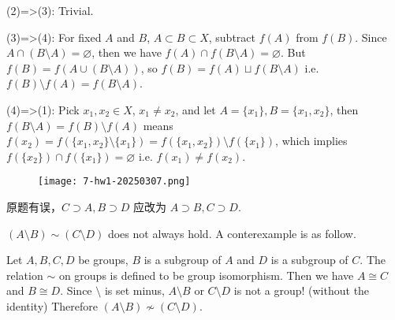 (2)=>(3): Trivial.

(3)=>(4): For fixed $A$ and $B$, $A\subset B\subset X$, subtract $f(A)$ from $f(B)$. Since $A\cap (B\setminus A)=\varnothing$,  then we have $f(A)\cap f(B\setminus A)=\varnothing$. But $f(B)=f(A\cup(B\setminus A))$, so $f (B)=f (A)\sqcup f(B\setminus A)$ i.e. $f (B)\setminus f(A)=f(B\setminus A)$.

(4)=>(1): Pick $x_1, x_2\in X$, $x_1\neq x_2$, and let $A=\{ x_1 \},B=\{ x_1,x_2 \}$, then $f (B\setminus A)=f (B)\setminus f(A)$ means $f (x_2)=f (\{ x_1, x_2 \}\setminus \{ x_1 \})=f (\{ x_1, x_2 \})\setminus f(\{ x_1 \})$, which implies $f(\{ x_2 \})\cap f(\{ x_1 \})=\varnothing$ i.e. $f(x_1)\neq f(x_2)$.

\begin{figure}[H]
\centering
\texttt{[image: 7-hw1-20250307.png]}
\label{}
\end{figure}

原题有误，$C\supset A, B\supset D$ 应改为 $A\supset B,C\supset D$.

$(A\setminus B)\sim(C\setminus D)$ does not always hold. A conterexample is as follow.

Let $A,B,C,D$ be groups, $B$ is a subgroup of $A$ and $D$ is a subgroup of $C$. The relation $\sim$ on groups is defined to be group isomorphism. Then we have $A\cong C$ and $B\cong D$. Since $\setminus$ is set minus, $A\setminus B$ or $C\setminus D$ is not a group! (without the identity) Therefore $(A\setminus B)\not\sim (C\setminus D)$.
